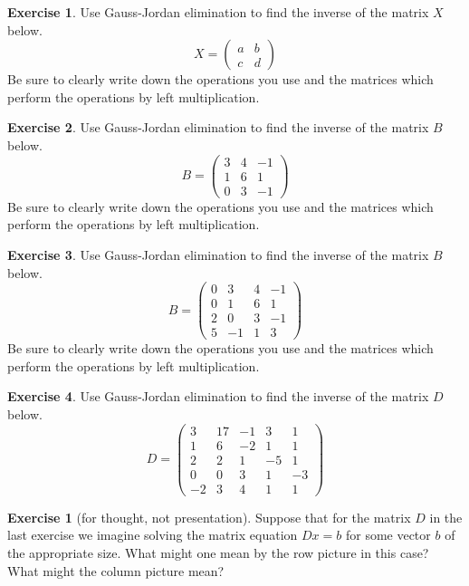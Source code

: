 \documentclass[11pt]{amsart}
\theoremstyle{definition}
\newtheorem{exercise}{Exercise}
\newtheorem*{noexercise}{Exercise}
\begin{document}
\begin{exercise}
Use Gauss-Jordan elimination to find the inverse of the matrix $X$ below.
\[
X = \begin{pmatrix} a & b \\ c & d \end{pmatrix}
\]
Be sure to clearly write down the operations you use and the matrices which perform the operations by left multiplication.
\end{exercise}

\begin{exercise}
Use Gauss-Jordan elimination to find the inverse of the matrix $B$ below.
\[
B = \begin{pmatrix} 3 & 4 & -1\\ 1 & 6 & 1 \\ 0 & 3 & -1 \end{pmatrix}
\]
Be sure to clearly write down the operations you use and the matrices which perform the operations by left multiplication.
\end{exercise}

\begin{exercise}
Use Gauss-Jordan elimination to find the inverse of the matrix $B$ below.
\[
B = \begin{pmatrix}
0 & 3 & 4 & -1\\
0 & 1 & 6 & 1 \\
2 & 0 & 3 & -1 \\
5 & -1 & 1 & 3
\end{pmatrix}
\]
Be sure to clearly write down the operations you use and the matrices which perform the operations by left multiplication.
\end{exercise}



\begin{exercise}
Use Gauss-Jordan elimination to find the inverse of the matrix $D$ below.
\[
D = \begin{pmatrix}
3 & 17 & -1 & 3 & 1 \\ 1 & 6 & -2 & 1 & 1 \\
2 & 2 & 1 & -5 & 1 \\ 0 & 0 & 3 & 1 & -3 \\
-2 & 3 & 4 & 1 & 1
\end{pmatrix}
\]
\end{exercise}

\begin{noexercise}[for thought, not presentation]
Suppose that for the matrix $D$ in the last exercise we imagine solving the matrix equation $Dx = b$ for some vector $b$ of the appropriate size. What might one mean by the row picture in this case? What might the column picture mean?
\end{noexercise}
\end{document}
